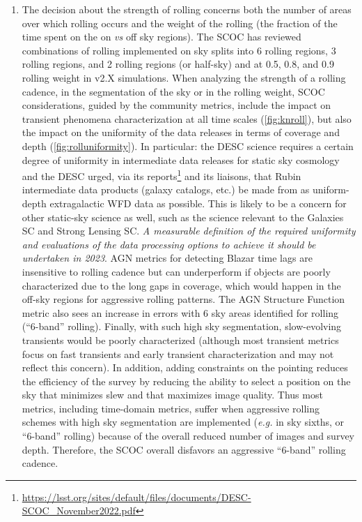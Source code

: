 \begin{enumerate}
 \item The decision about the strength of rolling concerns both the number of areas over which rolling occurs and the weight of the rolling (the fraction of the time spent on the on \emph{vs} off sky regions).  The SCOC has reviewed combinations of rolling implemented on sky splits into 6 rolling regions, 3 rolling regions, and 2 rolling regions (or half-sky) and at 0.5, 0.8, and 0.9 rolling weight in v2.X simulations. When analyzing the strength of a rolling cadence, in the segmentation of the sky or in the rolling weight, SCOC considerations, guided by the community metrics, include the impact on transient phenomena characterization at all time scales (\autoref{fig:knroll}), but also the impact on the uniformity of the data releases in terms of coverage and depth (\autoref{fig:rolluniformity}). In particular: the DESC science requires a certain degree of uniformity in intermediate data releases for static sky cosmology and the DESC urged, via its reports\footnote{\label{fn:descreport}\url{https://lsst.org/sites/default/files/documents/DESC-SCOC_November2022.pdf}} and its liaisons, that Rubin intermediate data products (galaxy catalogs, etc.) be made from as uniform-depth extragalactic WFD data as possible. This is likely to be a concern for other static-sky science as well, such as the science relevant to the Galaxies SC and Strong Lensing SC. \emph{A measurable definition of the required uniformity and evaluations of the data processing options to achieve it should be undertaken in 2023}. AGN metrics for detecting Blazar time lags are insensitive to rolling cadence but can underperform if objects are poorly characterized due to the long gaps in coverage, which would happen in the off-sky regions for aggressive rolling patterns. The AGN Structure Function metric also sees an increase in errors with 6 sky areas identified for rolling (``6-band'' rolling). Finally, with such high sky segmentation, slow-evolving transients would be poorly characterized (although most transient metrics focus on fast transients and early transient characterization and may not reflect this concern). In addition, adding constraints on the pointing reduces the efficiency of the survey by reducing the ability to select a position on the sky that minimizes slew and that maximizes image quality. Thus most metrics, including time-domain metrics, suffer when aggressive rolling schemes with high sky segmentation are implemented (\emph{e.g.} in sky sixths, or ``6-band'' rolling) because of the overall reduced number of images and survey depth. Therefore, the SCOC overall disfavors an aggressive ``6-band'' rolling cadence.

\end{enumerate}
